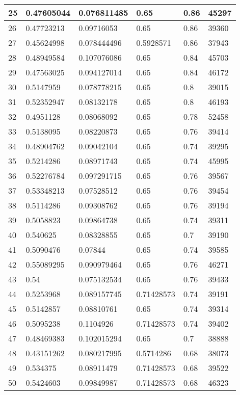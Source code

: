 \begin{longtable}{|l|l|l|l|l|l|}
25 & 0.47605044 & 0.076811485 & 0.65 & 0.86 & 45297 \\ \hline 
26 & 0.47723213 & 0.09716053 & 0.65 & 0.86 & 39360 \\ \hline 
27 & 0.45624998 & 0.078444496 & 0.5928571 & 0.86 & 37943 \\ \hline 
28 & 0.48949584 & 0.107076086 & 0.65 & 0.84 & 45703 \\ \hline 
29 & 0.47563025 & 0.094127014 & 0.65 & 0.84 & 46172 \\ \hline 
30 & 0.5147959 & 0.078778215 & 0.65 & 0.8 & 39015 \\ \hline 
31 & 0.52352947 & 0.08132178 & 0.65 & 0.8 & 46193 \\ \hline 
32 & 0.4951128 & 0.08068092 & 0.65 & 0.78 & 52458 \\ \hline 
33 & 0.5138095 & 0.08220873 & 0.65 & 0.76 & 39414 \\ \hline 
34 & 0.48904762 & 0.09042104 & 0.65 & 0.74 & 39295 \\ \hline 
35 & 0.5214286 & 0.08971743 & 0.65 & 0.74 & 45995 \\ \hline 
36 & 0.52276784 & 0.097291715 & 0.65 & 0.76 & 39567 \\ \hline 
37 & 0.53348213 & 0.07528512 & 0.65 & 0.76 & 39454 \\ \hline 
38 & 0.5114286 & 0.09308762 & 0.65 & 0.76 & 39194 \\ \hline 
39 & 0.5058823 & 0.09864738 & 0.65 & 0.74 & 39311 \\ \hline 
40 & 0.540625 & 0.08328855 & 0.65 & 0.7 & 39190 \\ \hline 
41 & 0.5090476 & 0.07844 & 0.65 & 0.74 & 39585 \\ \hline 
42 & 0.55089295 & 0.090979464 & 0.65 & 0.76 & 46271 \\ \hline 
43 & 0.54 & 0.075132534 & 0.65 & 0.76 & 39433 \\ \hline 
44 & 0.5253968 & 0.089157745 & 0.71428573 & 0.74 & 39191 \\ \hline 
45 & 0.5142857 & 0.08810761 & 0.65 & 0.74 & 39314 \\ \hline 
46 & 0.5095238 & 0.1104926 & 0.71428573 & 0.74 & 39402 \\ \hline 
47 & 0.48469383 & 0.102015294 & 0.65 & 0.7 & 38888 \\ \hline 
48 & 0.43151262 & 0.080217995 & 0.5714286 & 0.68 & 38073 \\ \hline 
49 & 0.534375 & 0.08911479 & 0.71428573 & 0.68 & 39522 \\ \hline 
50 & 0.5424603 & 0.09849987 & 0.71428573 & 0.68 & 46323 \\ \hline 
\end{longtable}
